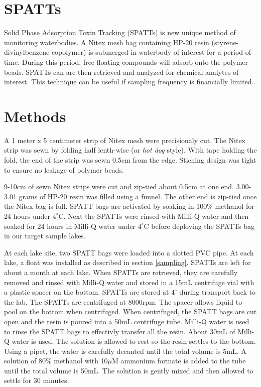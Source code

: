 
\section*{SPATTs}
Solid Phase Adsorption Toxin Tracking (SPATTs) is new unique method of monitoring waterbodies. A Nitex mesh bag containing HP-20 resin (styrene-divinylbenzene copolymer) is submerged in waterbody of interest for a period of time. During this period, free-floating compounds will adsorb onto the polymer beads. SPATTs can are then retrieved and analyzed for chemical analytes of interest. This technique can be useful if sampling frequency is financially limited..





\section*{Methods}

A 1 meter x 5 centimeter strip of Nitex mesh were precisionaly cut. The Nitex strip was sewn by folding half lenth-wise (or \emph{hot dog} style). With tape holding the fold, the end of the strip was sewn 0.5cm from the edge. Stiching design was tight to ensure no leakage of polymer beads.

9-10cm of sewn Nitex strips were cut and zip-tied about 0.5cm at one end. 3.00-3.01 grams of HP-20 resin was filled using a funnel. The other end is zip-tied once the Nitex bag is full. SPATT bags are activated by soaking in 100\% methanol for 24 hours under $4^\circ$C. Next the SPATTs were rinsed with Milli-Q water and then soaked for 24 hours in Milli-Q water under $4^\circ$C before deploying the SPATTs bag in our target sample lakes.

At each lake site, two SPATT bags were loaded into a slotted PVC pipe. At each lake, a float was installed as described in section \ref{sampling}. SPATTs are left for about a month at each lake. When SPATTs are retrieved, they are carefully removed and rinsed with Milli-Q water and stored in a 15mL centrifuge vial with a plastic spacer on the bottom. SPATTs are stored at $4^\circ$ during transport back to the lab. The SPATTs are centrifuged at 8000rpm. The spacer allows liquid to pool on the bottom when centrifuged. When centrifuged, the SPATT bags are cut open and the resin is poured into a 50mL centrifuge tube. Milli-Q water is used to rinse the SPATT bags to effectivly transfer all the resin. About 30mL of Milli-Q water is used. The solution is allowed to rest so the resin settles to the bottom. Using a pipet, the water is carefully decanted until the total volume is 5mL.  A solution of 80\% methanol with 10$\mu$M ammonium formate is added to the tube until the total volume is 50mL. The solution is gently mixed and then allowed to settle for 30 minutes.

